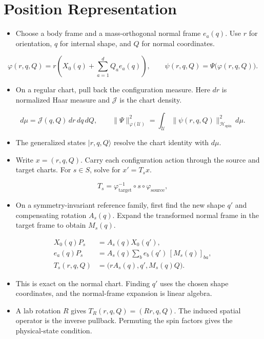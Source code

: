 \documentclass[12pt]{article}
\newcommand{\spin}{\mathcal{H}_{\mathrm{spin}}}
\begin{document}
\section{Position Representation}
\label{sec:position-coordinates}
\begin{itemize}
\item Choose a body frame and a mass-orthogonal normal frame $e_a(q)$.
Use $r$ for orientation, $q$ for internal shape, and $Q$ for normal coordinates.
\end{itemize}
\[
\varphi(r,q,Q)=r\left(X_0(q)+\sum_{a=1}^{d}Q_a e_a(q)\right),
\qquad\psi(r,q,Q)=\Psi\bigl(\varphi(r,q,Q)\bigr).
\]
\begin{itemize}
\item On a regular chart, pull back the configuration measure.
Here $dr$ is normalized Haar measure and $\mathcal J$ is the chart density.
\end{itemize}
\[
d\mu=\mathcal J(q,Q)\,dr\,dq\,dQ,
\qquad
\|\Psi\|_{\varphi(\mathcal U)}^2
=\int_{\mathcal U}\|\psi(r,q,Q)\|_{\spin}^2\,d\mu.
\]
\begin{itemize}
\item The generalized states $|r,q,Q\rangle$ resolve the chart identity with $d\mu$.
\item Write $x=(r,q,Q)$. Carry each configuration action through the
source and target charts. For $s\in S$, solve for $x'=T_sx$.
\end{itemize}
\[
T_s=\varphi_{\mathrm{target}}^{-1}\circ s\circ\varphi_{\mathrm{source}},
\]
\begin{itemize}
\item On a symmetry-invariant reference family, first find the new
shape $q'$ and compensating rotation $A_s(q)$. Expand the transformed
normal frame in the target frame to obtain $M_s(q)$.
\end{itemize}
\[
\begin{aligned}
X_0(q)P_s&=A_s(q)X_0(q'),\\
e_a(q)P_s&=A_s(q)\sum_b e_b(q')\,[M_s(q)]_{ba},\\
T_s(r,q,Q)&=\bigl(rA_s(q),q',M_s(q)Q\bigr).
\end{aligned}
\]
\begin{itemize}
\item This is exact on the normal chart. Finding $q'$ uses the chosen
shape coordinates, and the normal-frame expansion is linear algebra.
\item A lab rotation $R$ gives $T_R(r,q,Q)=(Rr,q,Q)$.
The induced spatial operator is the inverse pullback. Permuting the
spin factors gives the physical-state condition.
\end{itemize}
\end{document}
